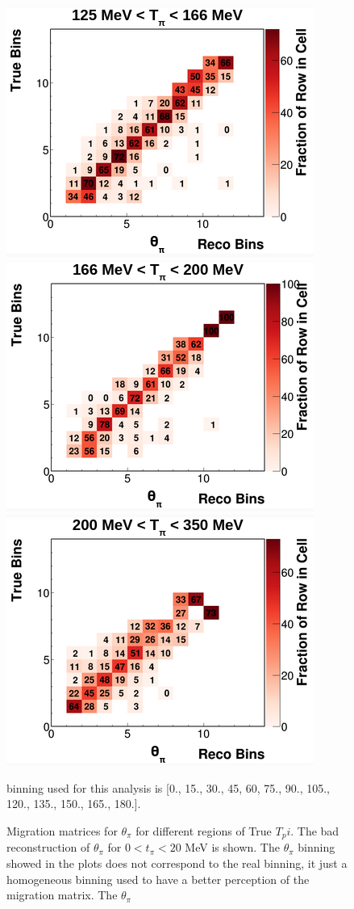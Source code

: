 \begin{figure}[!htb]
    \includegraphics[scale=0.33]{Figures/Chapter4/SignalDefinition/thetapi125to166tpi.png}
    \includegraphics[scale=0.33]{Figures/Chapter4/SignalDefinition/thetapi166to200tpi.png}
    \includegraphics[scale=0.33]{Figures/Chapter4/SignalDefinition/thetapi200to350tpi.png}
    \caption{Migration matrices for $\theta_\pi$ for different regions of True $T_pi$. The bad reconstruction of $\theta_\pi$ for $0<t_\pi<20$ MeV is shown. The $\theta_\pi$ binning showed in the plots does not correspond to the real binning, it just a homogeneous binning used to have a better perception of the migration matrix. The $\theta_\pi$} binning used for this analysis is [0., 15., 30., 45, 60, 75., 90., 105., 120., 135., 150., 165., 180.].
    \label{fig:Analysis:SignalDefinition:1DAnalysis:thetapivsTpi}
\end{figure}


